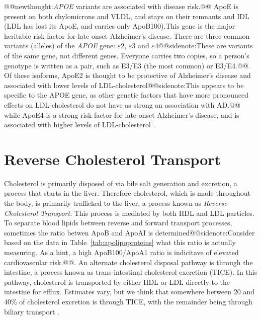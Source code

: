 \documentclass{tufte-handout}
\makeatletter
\def\newthought#1{@@newthought:#1@@}
\def\sidenote#1{@@sidenote:#1@@}
\makeatother
\begin{document}
\newthought{\textit{APOE} variants are associated with disease risk.}  ApoE is present on both chylomicrons and VLDL, and stays on their remnants and IDL (LDL has lost its ApoE, and carries only ApoB100).\@  This gene is the major heritable risk factor for late onset Alzheimer's disease.  There are three common variants (alleles) of the \textit{APOE} gene: $\varepsilon$2, $\varepsilon$3 and $\varepsilon$4\sidenote{These are variants of the same gene, not different genes.  Everyone carries two copies, so a person's genotype is written as a pair, such as E3/E3 (the most common) or E3/E4.}.  Of these isoforms, ApoE2 is thought to be protective of Alzheimer's disease and associated with lower levels of LDL-cholesterol\sidenote{This appears to be specific to the APOE gene, as other genetic factors that have more pronounced effects on LDL-cholesterol do not have as strong an association with AD.} while ApoE4 is a strong risk factor for late-onset Alzheimer's disease, and is associated with higher levels of LDL-cholesterol \citep{Poirier1993,Corder1993}.  

\section{Reverse Cholesterol Transport}

Cholesterol is primarily disposed of via bile salt generation and excretion, a process that starts in the liver.  Therefore cholesterol, which is made throughout the body, is primarily trafficked to the liver, a process known as \emph{Reverse Cholesterol Transport}.  This process is mediated by both HDL and LDL particles.  To separate blood lipids between reverse and forward transport processes, sometimes the ratio betwen ApoB and ApoAI is determined\sidenote{Consider based on the data in Table~\ref{tab:apolipoproteins} what this ratio is actually measuring.  As a hint, a high ApoB100/ApoA1 ratio is indicitave of elevated cardiovascular risk.}.  An alternate cholesterol disposal pathway is through the intestine, a process known as trans-intestinal cholesterol excretion (TICE).  In this pathway, cholesterol is transported by either HDL or LDL directly to the intestine for efflux.  Estimates vary, but we think that somewhere between 20 and 40\% of cholesterol excretion is through TICE, with the remainder being through biliary transport \citep{Temel2015}.
\end{document}
